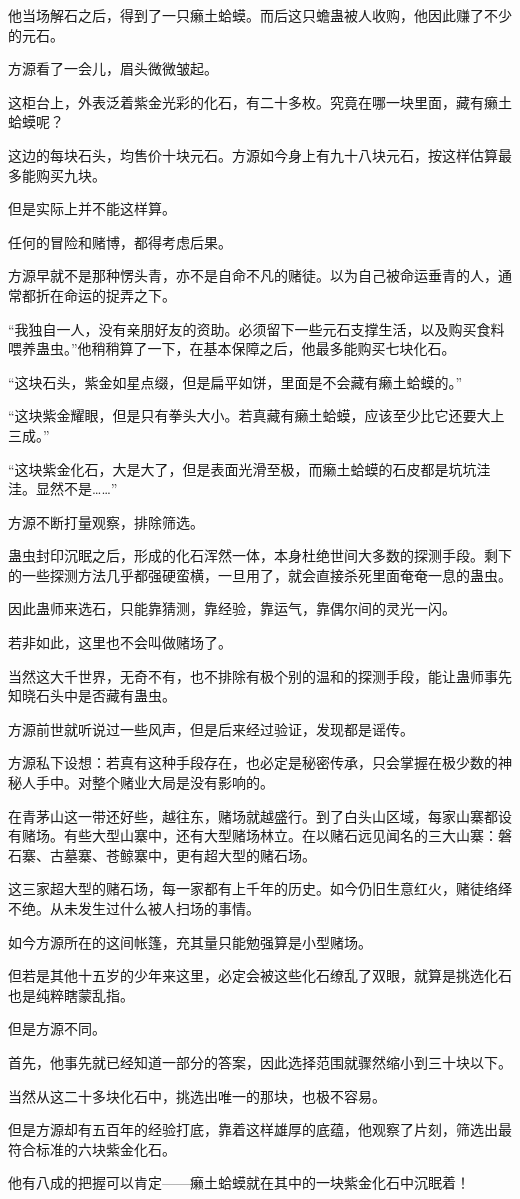 \begin{this_body}
他当场解石之后，得到了一只癞土蛤蟆。而后这只蟾蛊被人收购，他因此赚了不少的元石。

方源看了一会儿，眉头微微皱起。

这柜台上，外表泛着紫金光彩的化石，有二十多枚。究竟在哪一块里面，藏有癞土蛤蟆呢？

这边的每块石头，均售价十块元石。方源如今身上有九十八块元石，按这样估算最多能购买九块。

但是实际上并不能这样算。

任何的冒险和赌博，都得考虑后果。

方源早就不是那种愣头青，亦不是自命不凡的赌徒。以为自己被命运垂青的人，通常都折在命运的捉弄之下。

“我独自一人，没有亲朋好友的资助。必须留下一些元石支撑生活，以及购买食料喂养蛊虫。”他稍稍算了一下，在基本保障之后，他最多能购买七块化石。

“这块石头，紫金如星点缀，但是扁平如饼，里面是不会藏有癞土蛤蟆的。”

“这块紫金耀眼，但是只有拳头大小。若真藏有癞土蛤蟆，应该至少比它还要大上三成。”

“这块紫金化石，大是大了，但是表面光滑至极，而癞土蛤蟆的石皮都是坑坑洼洼。显然不是……”

方源不断打量观察，排除筛选。

蛊虫封印沉眠之后，形成的化石浑然一体，本身杜绝世间大多数的探测手段。剩下的一些探测方法几乎都强硬蛮横，一旦用了，就会直接杀死里面奄奄一息的蛊虫。

因此蛊师来选石，只能靠猜测，靠经验，靠运气，靠偶尔间的灵光一闪。

若非如此，这里也不会叫做赌场了。

当然这大千世界，无奇不有，也不排除有极个别的温和的探测手段，能让蛊师事先知晓石头中是否藏有蛊虫。

方源前世就听说过一些风声，但是后来经过验证，发现都是谣传。

方源私下设想：若真有这种手段存在，也必定是秘密传承，只会掌握在极少数的神秘人手中。对整个赌业大局是没有影响的。

在青茅山这一带还好些，越往东，赌场就越盛行。到了白头山区域，每家山寨都设有赌场。有些大型山寨中，还有大型赌场林立。在以赌石远见闻名的三大山寨：磐石寨、古墓寨、苍鲸寨中，更有超大型的赌石场。

这三家超大型的赌石场，每一家都有上千年的历史。如今仍旧生意红火，赌徒络绎不绝。从未发生过什么被人扫场的事情。

如今方源所在的这间帐篷，充其量只能勉强算是小型赌场。

但若是其他十五岁的少年来这里，必定会被这些化石缭乱了双眼，就算是挑选化石也是纯粹瞎蒙乱指。

但是方源不同。

首先，他事先就已经知道一部分的答案，因此选择范围就骤然缩小到三十块以下。

当然从这二十多块化石中，挑选出唯一的那块，也极不容易。

但是方源却有五百年的经验打底，靠着这样雄厚的底蕴，他观察了片刻，筛选出最符合标准的六块紫金化石。

他有八成的把握可以肯定——癞土蛤蟆就在其中的一块紫金化石中沉眠着！

\end{this_body}

